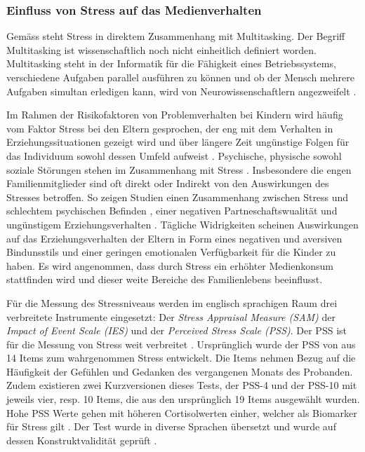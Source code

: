 \subsubsection{Einfluss von Stress auf das Medienverhalten}
Gemäss  steht Stress in direktem Zusammenhang mit Multitasking. Der Begriff Multitasking ist wissenschaftlich noch nicht einheitlich definiert worden. Multitasking steht in der Informatik für die Fähigkeit eines Betriebssystems, verschiedene Aufgaben parallel ausführen zu können  und ob der Mensch mehrere Aufgaben simultan erledigen kann, wird von Neurowissenschaftlern angezweifelt \cite{Zimber2016}. 

Im Rahmen der Risikofaktoren von Problemverhalten bei Kindern wird häufig vom Faktor Stress bei den Eltern gesprochen, der eng mit dem Verhalten in Erziehungssituationen gezeigt wird und über längere Zeit ungünstige Folgen für das Individuum sowohl dessen Umfeld aufweist \cite{Cina2009}. Psychische, physische sowohl soziale Störungen stehen im Zusammenhang mit Stress \cite{Elfering2002, Burisch1994}. Insbesondere die engen Familienmitglieder sind oft direkt oder Indirekt von den Auswirkungen des Stresses betroffen. So zeigen Studien einen Zusammenhang zwischen Stress und schlechtem psychischen Befinden \cite{Burisch1994, Krohne1997}, einer negativen Partneschaftswualität \cite{Bodenmann2000, Bodenmann1999, Bodenmann2000a} und ungünstigem Erziehungsverhalten \cite{Abidin1992, Belsky1984, WebsterStratton2000}. Tägliche Widrigkeiten scheinen Auswirkungen auf das Erziehungsverhalten der Eltern in Form eines negativen und aversiven Bindunsstils \cite{Dumas1989, Webster-Stratton1988} und einer geringen emotionalen Verfügbarkeit für die Kinder \cite{Campbell1991} zu haben. Es wird angenommen, dass durch Stress ein erhöhter Medienkonsum stattfinden wird und dieser weite Bereiche des Familienlebens beeinflusst.

Für die Messung des Stressniveaus werden im englisch sprachigen Raum drei verbreitete Instrumente eingesetzt: Der \textit{Stress Appraisal Measure (SAM)} der \textit{Impact of Event Scale (IES)} und der \textit{Perceived Stress Scale (PSS)}. Der PSS ist für die Messung von Stress weit verbreitet \cite{Andreou2011}. Ursprünglich wurde der PSS von  aus 14 Items zum wahrgenommen Stress entwickelt. Die Items nehmen Bezug auf die Häufigkeit der Gefühlen und Gedanken des vergangenen Monats des Probanden. Zudem existieren zwei Kurzversionen dieses Tests, der PSS-4 und der PSS-10 mit jeweils vier, resp. 10 Items, die aus den ursprünglich 19 Items ausgewählt wurden. Hohe PSS Werte gehen mit höheren Cortisolwerten einher, welcher als Biomarker für Stress gilt \cite{Malarkey1995, VanEck2005}. Der Test wurde in diverse Sprachen übersetzt und wurde auf dessen Konstruktvalidität geprüft \cite{Cohen1988, Byrne2005}.

